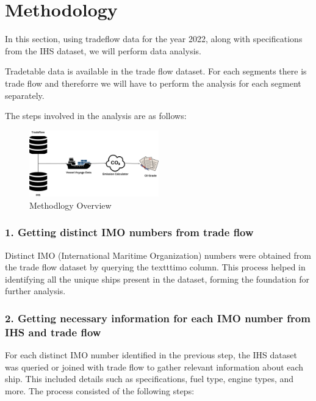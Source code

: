 \section{Methodology}


In this section, using tradeflow data for the year 2022, along with specifications from the IHS dataset, we will perform data analysis.

Tradetable data is available in the trade flow dataset. For each segments there is trade flow and thereforre we will have to perform the analysis for each segment separately.

The steps involved in the analysis are as follows:

\begin{figure}[h]
    \centering
    \includegraphics[width=0.5\textwidth]{images/methodlogy.png}
    \caption{Methodlogy Overview}
    \label{methodlogy}
\end{figure}

\newpage

\subsubsection{1. Getting distinct IMO numbers from trade flow}

Distinct IMO (International Maritime Organization) numbers were obtained from the trade flow dataset by querying the texttt{imo} column. 
This process helped in identifying all the unique ships present in the dataset, forming the foundation for further analysis.


\subsubsection{2. Getting necessary information for each IMO number from IHS and trade flow}

For each distinct IMO number identified in the previous step, the IHS dataset was queried or joined with trade flow to gather relevant information about each ship. 
This included details such as specifications, fuel type, engine types, and more. 
The process consisted of the following steps:

